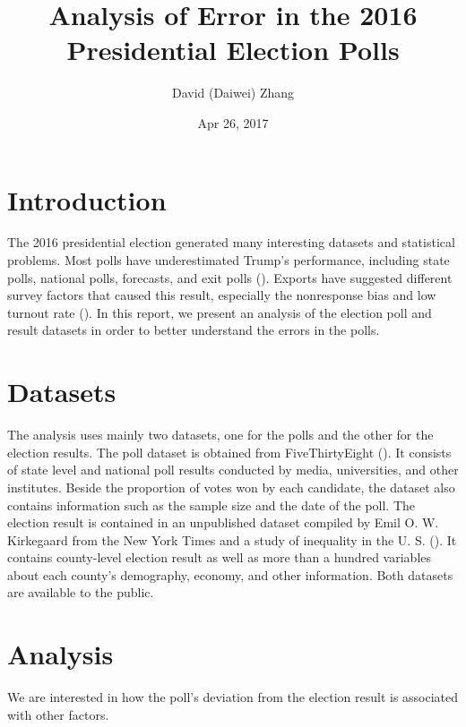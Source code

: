 \documentclass[12pt]{article}
\begin{document}
\setlength{\textheight}{625pt} \setlength{\baselineskip}{23pt}

\title{Analysis of Error in the 2016 Presidential Election Polls}
\author{David (Daiwei) Zhang}
\date{Apr 26, 2017}
\maketitle

\noindent

\section{Introduction} \label{sec:intro}

The 2016 presidential election generated many interesting datasets and statistical problems.
Most polls have underestimated Trump's performance,
including state polls, national polls, forecasts, and exit polls (\cite{bialik}).
Exports have suggested different survey factors that caused this result,
especially the nonresponse bias and low turnout rate (\cite{stein}).
In this report, we present an analysis of the election poll and result datasets in order to better understand the errors in the polls.

\section{Datasets} \label{sec:data}

The analysis uses mainly two datasets, one for the polls and the other for the election results.
The poll dataset is obtained from FiveThirtyEight (\cite{pollData}).
It consists of state level and national poll results conducted by media, universities, and other institutes.
Beside the proportion of votes won by each candidate, the dataset also contains information such as the sample size and the date of the poll.
The election result is contained in an unpublished dataset compiled by Emil O. W. Kirkegaard from the New York Times and a study of inequality in the U. S. (\cite{kirkegaard}).
It contains county-level election result as well as more than a hundred variables about each county's demography, economy, and other information.
Both datasets are available to the public.

\section{Analysis} \label{sec:analy}

We are interested in how the poll's deviation from the election result is associated with other factors.
\end{document}

